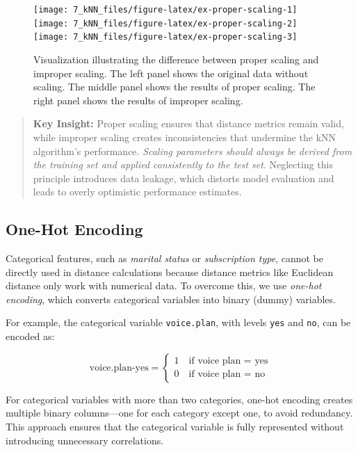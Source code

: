\documentclass[
  11pt,
]{book}
\newcommand{\passthrough}[1]{#1}
\theoremstyle{definition}
\theoremstyle{definition}
\theoremstyle{definition}
\theoremstyle{definition}
\theoremstyle{remark}
\begin{document}
\begin{figure}[H]

{\centering \texttt{[image: 7\_kNN\_files/figure-latex/ex-proper-scaling-1]} \texttt{[image: 7\_kNN\_files/figure-latex/ex-proper-scaling-2]} \texttt{[image: 7\_kNN\_files/figure-latex/ex-proper-scaling-3]} 

}

\caption{Visualization illustrating the difference between proper scaling and improper scaling. The left panel shows the original data without scaling. The middle panel shows the results of proper scaling. The right panel shows the results of improper scaling.}\label{fig:ex-proper-scaling}
\end{figure}

\begin{quote}
\textbf{Key Insight:} Proper scaling ensures that distance metrics remain valid, while improper scaling creates inconsistencies that undermine the kNN algorithm's performance. \emph{Scaling parameters should always be derived from the training set and applied consistently to the test set}. Neglecting this principle introduces data leakage, which distorts model evaluation and leads to overly optimistic performance estimates.
\end{quote}

\subsection{One-Hot Encoding}\label{one-hot-encoding-1}

Categorical features, such as \emph{marital status} or \emph{subscription type}, cannot be directly used in distance calculations because distance metrics like Euclidean distance only work with numerical data. To overcome this, we use \emph{one-hot encoding}, which converts categorical variables into binary (dummy) variables.

For example, the categorical variable \passthrough{\lstinline!voice.plan!}, with levels \passthrough{\lstinline!yes!} and \passthrough{\lstinline!no!}, can be encoded as:

\[
\text{voice.plan-yes} = 
\begin{cases}
1 \quad \text{if voice plan = yes}  \\
0 \quad \text{if voice plan = no} 
\end{cases}
\]

For categorical variables with more than two categories, one-hot encoding creates multiple binary columns---one for each category except one, to avoid redundancy. This approach ensures that the categorical variable is fully represented without introducing unnecessary correlations.
\end{document}
